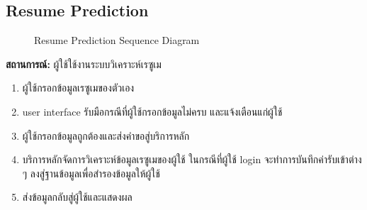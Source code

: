 \subsection{Resume Prediction}
\begin{figure}[H]\centering
    \setlength{\fboxrule}{0.2mm} %
    \caption{Resume Prediction Sequence Diagram}\label{fig:resumePredictSeqDiagram}
\end{figure}
\textbf{สถานการณ์: }ผู้ใช้ใช้งานระบบวิเคราะห์เรซูเม
\begin{enumerate}
    \item ผู้ใช้กรอกข้อมูลเรซูเมของตัวเอง
    \item user interface รับมือกรณีที่ผู้ใช้กรอกข้อมูลไม่ครบ และแจ้งเตือนแก่ผู้ใช้
    \item ผู้ใช้กรอกข้อมูลถูกต้องและส่งคำขอสู่บริการหลัก
    \item บริการหลักจัดการวิเคราะห์ข้อมูลเรซูเมของผู้ใช้ ในกรณีที่ผู้ใช้ login จะทำการบันทึกค่ารับเข้าต่าง ๆ ลงสู่ฐานข้อมูลเพื่อสำรองข้อมูลให้ผู้ใช้
    \item ส่งข้อมูลกลับสู่ผู้ใช้และแสดงผล
\end{enumerate}

